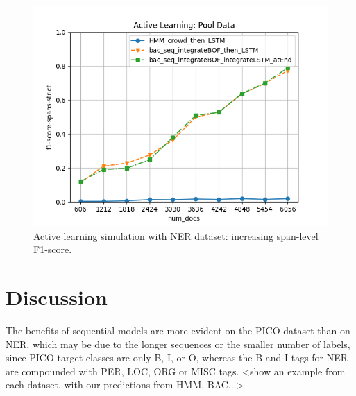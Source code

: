 \begin{figure}
\centering
  \includegraphics[width=1\columnwidth, clip=True, trim=35 0 40 40]{figures/NER_AL/pool/plot_f1-score-spans-strict.png}
\caption{Active learning simulation with NER dataset: increasing span-level F1-score.
}
\label{fig:al}
\end{figure}

\section{Discussion}

The benefits of sequential models are more evident on the PICO dataset than on NER, which may be due to the longer sequences or the smaller number of labels, since PICO target classes are only B, I, or O, whereas the B and I tags for NER 
are compounded with PER, LOC, ORG or MISC tags. <show an example from each dataset, with our predictions from HMM, BAC...>
